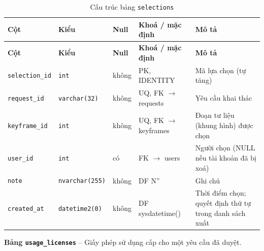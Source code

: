 \setlength{\tabcolsep}{4pt}
\begin{longtable}{>{\raggedright\arraybackslash}p{}>{\raggedright\arraybackslash}p{}>{\centering\arraybackslash}p{}>{\raggedright\arraybackslash}p{}>{\raggedright\arraybackslash}p{}}
\caption{Cấu trúc bảng \texttt{selections}}\label{tab:col_selections}\\
\toprule \textbf{Cột} & \textbf{Kiểu} & \textbf{Null} & \textbf{Khoá / mặc định} & \textbf{Mô tả} \\ \midrule \endfirsthead
\toprule \textbf{Cột} & \textbf{Kiểu} & \textbf{Null} & \textbf{Khoá / mặc định} & \textbf{Mô tả} \\ \midrule \endhead
\bottomrule \endfoot
\texttt{selection\_id} & {\footnotesize\texttt{int}} & không & PK, IDENTITY & Mã lựa chọn (tự tăng) \\
\texttt{request\_id} & {\footnotesize\texttt{varchar(32)}} & không & UQ, FK $\rightarrow$ requests & Yêu cầu khai thác \\
\texttt{keyframe\_id} & {\footnotesize\texttt{int}} & không & UQ, FK $\rightarrow$ keyframes & Đoạn tư liệu (khung hình) được chọn \\
\texttt{user\_id} & {\footnotesize\texttt{int}} & có & FK $\rightarrow$ users & Người chọn (NULL nếu tài khoản đã bị xoá) \\
\texttt{note} & {\footnotesize\texttt{nvarchar(255)}} & không & DF N'' & Ghi chú \\
\texttt{created\_at} & {\footnotesize\texttt{datetime2(0)}} & không & DF sysdatetime() & Thời điểm chọn; quyết định thứ tự trong danh sách xuất \\
\end{longtable}

\textbf{Bảng \texttt{usage\_licenses}} -- Giấy phép sử dụng cấp cho một yêu cầu đã duyệt.

